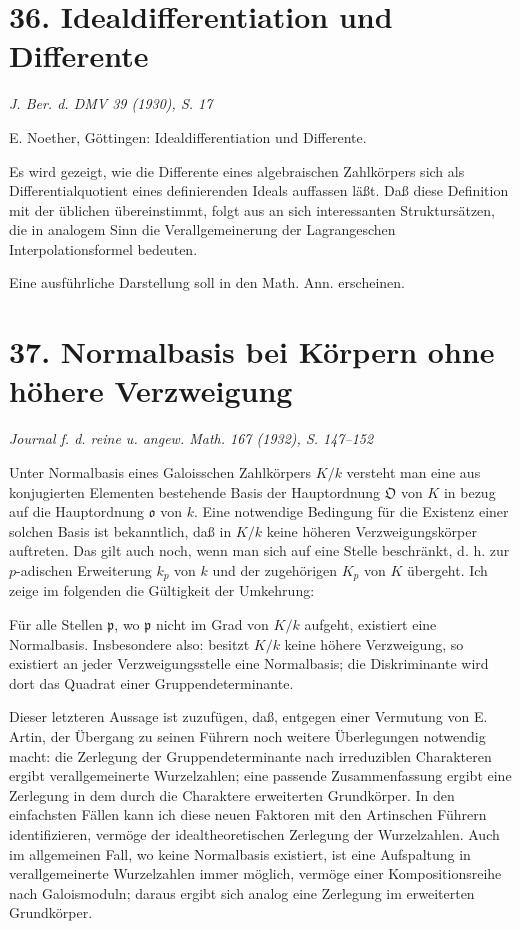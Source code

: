 \documentclass[11pt]{article}
\providecommand{\frako}{\mathfrak o}
\providecommand{\frakp}{\mathfrak p}
\providecommand{\frakO}{\mathfrak O}
\begin{document}
\section*{36. Idealdifferentiation und Differente}

\begin{center}
\emph{J. Ber. d. DMV 39 (1930), S. 17}
\end{center}

E. Noether, Göttingen: Idealdifferentiation und Differente.

Es wird gezeigt, wie die Differente eines algebraischen Zahlkörpers sich als Differentialquotient eines definierenden Ideals auffassen läßt. Daß diese Definition mit der üblichen übereinstimmt, folgt aus an sich interessanten Struktursätzen, die in analogem Sinn die Verallgemeinerung der Lagrangeschen Interpolationsformel bedeuten.

Eine ausführliche Darstellung soll in den Math. Ann. erscheinen.

\section*{37. Normalbasis bei Körpern ohne höhere Verzweigung}

\begin{center}
\emph{Journal f. d. reine u. angew. Math. 167 (1932), S. 147--152}
\end{center}

Unter Normalbasis eines Galoisschen Zahlkörpers \(K/k\) versteht man eine aus konjugierten Elementen bestehende Basis der Hauptordnung \(\frakO\) von \(K\) in bezug auf die Hauptordnung \(\frako\) von \(k\). Eine notwendige Bedingung für die Existenz einer solchen Basis ist bekanntlich, daß in \(K/k\) keine höheren Verzweigungskörper auftreten. Das gilt auch noch, wenn man sich auf eine Stelle beschränkt, d. h. zur \(p\)-adischen Erweiterung \(k_p\) von \(k\) und der zugehörigen \(K_p\) von \(K\) übergeht. Ich zeige im folgenden die Gültigkeit der Umkehrung:

Für alle Stellen \(\frakp\), wo \(\frakp\) nicht im Grad von \(K/k\) aufgeht, existiert eine Normalbasis. Insbesondere also: besitzt \(K/k\) keine höhere Verzweigung, so existiert an jeder Verzweigungsstelle eine Normalbasis; die Diskriminante wird dort das Quadrat einer Gruppendeterminante.

Dieser letzteren Aussage ist zuzufügen, daß, entgegen einer Vermutung von E. Artin, der Übergang zu seinen Führern noch weitere Überlegungen notwendig macht: die Zerlegung der Gruppendeterminante nach irreduziblen Charakteren ergibt verallgemeinerte Wurzelzahlen; eine passende Zusammenfassung ergibt eine Zerlegung in dem durch die Charaktere erweiterten Grundkörper. In den einfachsten Fällen kann ich diese neuen Faktoren mit den Artinschen Führern identifizieren, vermöge der idealtheoretischen Zerlegung der Wurzelzahlen. Auch im allgemeinen Fall, wo keine Normalbasis existiert, ist eine Aufspaltung in verallgemeinerte Wurzelzahlen immer möglich, vermöge einer Kompositionsreihe nach Galoismoduln; daraus ergibt sich analog eine Zerlegung im erweiterten Grundkörper.
\end{document}
